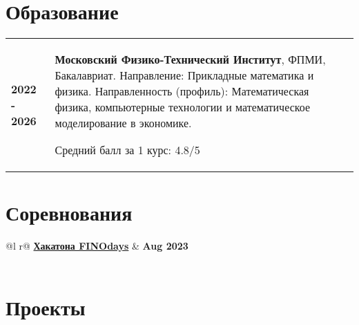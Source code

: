 \documentclass[a4paper,11pt]{article}
\begin{document}
\section{Образование}
\begin{tabularx}{\linewidth}{@{}l X@{}}	

\textbf{2022 - 2026} & \textbf{Московский Физико-Технический Институт}, ФПМИ, Бакалавриат. Направление: Прикладные математика и физика. 
Направленность (профиль): Математическая физика, компьютерные технологии и математическое моделирование в экономике.

\normalsize Средний балл за 1 курс: 4.8/5 \\ 

\end{tabularx}


\section{Соревнования}


\begin{tabularx}{\linewidth}{ @{}l r@{}  }
\href{https://365.finopolis.ru/finodays/}{\textbf{Хакатона FINOdays}} &  \hfill \textbf{Aug 2023}\\[3.75pt]
  \\
\end{tabularx}

\section{Проекты}
\end{document}
